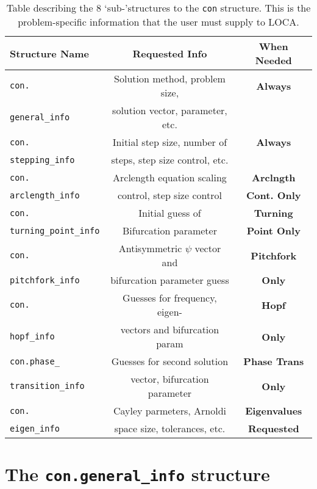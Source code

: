 \begin{table}[tb]   \begin{center}     \begin{tabular}{|l|c|c|} 
\hline \textbf{Structure Name}& \textbf{Requested Info} & \textbf{When Needed} \\ \hline
\texttt{con.}& Solution method, problem size, & \bf{Always} \\ \texttt{general\_info}& solution vector, parameter, etc. & \\ \hline
\texttt{con.}& Initial step size, number of& \bf{Always} \\ \texttt{stepping\_info}& steps, step size control, etc.& \\ \hline
\texttt{con.}& Arclength equation scaling& \bf{Arclngth} \\ \texttt{arclength\_info}& control, step size control & \bf{Cont. Only}\\ \hline
\texttt{con.}& Initial guess of & \bf{Turning} \\ \texttt{turning\_point\_info}& Bifurcation parameter & \bf{Point Only} \\ \hline
\texttt{con.}& Antisymmetric $\psi$ vector and& \bf{Pitchfork} \\ \texttt{pitchfork\_info}& bifurcation parameter guess & \bf{Only} \\ \hline
\texttt{con.}& Guesses for frequency, eigen-& \bf{Hopf} \\ \texttt{hopf\_info}& vectors and bifurcation param & \bf{Only} \\ \hline
\texttt{con.phase\_}&  Guesses for second solution& \bf{Phase Trans} \\ \texttt{transition\_info}& vector, bifurcation parameter & \bf{Only} \\ \hline
\texttt{con.}& Cayley parmeters, Arnoldi& \bf{Eigenvalues} \\ \texttt{eigen\_info}& space size, tolerances, etc. & \bf{Requested} \\ \hline
\end{tabular} \caption{Table describing the $8$ `sub-'structures to the \texttt{con} 
structure. This is the problem-specific information that the user must supply to LOCA.} 
\label{tab:con} \end{center} \end{table}


\section{The \texttt{con.general\_info} structure}

